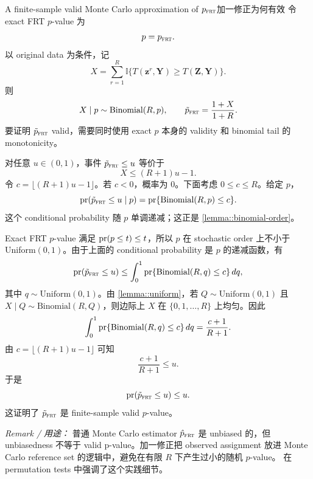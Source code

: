 \begin{exercisesolution}{A finite-sample valid Monte Carlo approximation of $p_{\textsc{frt}}$}{加一修正为何有效}
令 exact FRT $p$-value 为
\[
p=p_{\textsc{frt}}.
\]
以 original data 为条件，记
\[
X=\sum_{r=1}^R \mathbb{I}\{T(\boldsymbol{z}^r,\boldsymbol{Y})\geq T(\boldsymbol{Z},\boldsymbol{Y})\}.
\]
则
\[
X\mid p\sim \text{Binomial}(R,p),\qquad
\tilde p_{\textsc{frt}}=\frac{1+X}{1+R}.
\]
要证明 $\tilde p_{\textsc{frt}}$ valid，需要同时使用 exact $p$ 本身的 validity 和 binomial tail 的 monotonicity。

对任意 $u\in(0,1)$，事件 $\tilde p_{\textsc{frt}}\leq u$ 等价于
\[
X\leq (R+1)u-1.
\]
令 $c=\lfloor (R+1)u-1\rfloor$。若 $c<0$，概率为 $0$。下面考虑 $0\leq c\leq R$。给定 $p$，
\[
\textup{pr}(\tilde p_{\textsc{frt}}\leq u\mid p)=\textup{pr}\{\text{Binomial}(R,p)\leq c\}.
\]
这个 conditional probability 随 $p$ 单调递减；这正是 \cref{lemma::binomial-order}。

Exact FRT $p$-value 满足 $\textup{pr}(p\leq t)\leq t$，所以 $p$ 在 stochastic order 上不小于 Uniform$(0,1)$。由于上面的 conditional probability 是 $p$ 的递减函数，有
\[
\textup{pr}(\tilde p_{\textsc{frt}}\leq u)
\leq
\int_0^1 \textup{pr}\{\text{Binomial}(R,q)\leq c\}\,dq,
\]
其中 $q\sim \text{Uniform}(0,1)$。由 \cref{lemma::uniform}，若 $Q\sim \text{Uniform}(0,1)$ 且 $X\mid Q\sim \text{Binomial}(R,Q)$，则边际上 $X$ 在 $\{0,1,\ldots,R\}$ 上均匀。因此
\[
\int_0^1 \textup{pr}\{\text{Binomial}(R,q)\leq c\}\,dq
=\frac{c+1}{R+1}.
\]
由 $c=\lfloor (R+1)u-1\rfloor$ 可知
\[
\frac{c+1}{R+1}\leq u.
\]
于是
\[
\textup{pr}(\tilde p_{\textsc{frt}}\leq u)\leq u.
\]
这证明了 $\tilde p_{\textsc{frt}}$ 是 finite-sample valid $p$-value。

\emph{Remark / 用途：} 普通 Monte Carlo estimator $\hat p_{\textsc{frt}}$ 是 unbiased 的，但 unbiasedness 不等于 valid p-value。加一修正把 observed assignment 放进 Monte Carlo reference set 的逻辑中，避免在有限 $R$ 下产生过小的随机 $p$-value。\citet{phipson2010permutation} 在 permutation tests 中强调了这个实践细节。
\end{exercisesolution}

